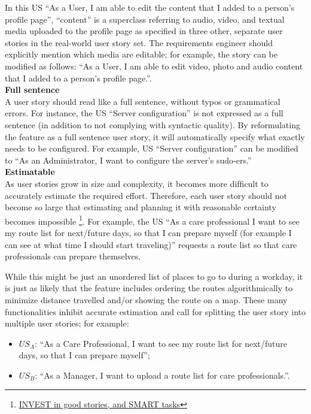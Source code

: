 In this US \enquote{As a User, I am able to edit the content that I added to a person's profile page}, \enquote{content} is a superclass referring to audio, video, and textual media uploaded to the proﬁle page as speciﬁed in three other, separate user stories in the real-world user story set. The requirements engineer should explicitly mention which media are editable; for example, the story can be modiﬁed as follows: \enquote{As a User, I am able to edit video, photo and audio content that I added to a person’s proﬁle page.}. \\ 
\textbf{Full sentence}\\ 
A user story should read like a full sentence, without typos or grammatical errors. For instance, the US \enquote{Server conﬁguration} is not expressed as a full sentence (in addition to not complying with syntactic quality). By reformulating the feature as a full sentence user story, it will automatically specify what exactly needs to be conﬁgured. For example, US \enquote{Server conﬁguration} can be modiﬁed to \enquote{As an Administrator, I want to conﬁgure the server’s sudo-ers.} \\ 
\textbf{Estimatable}\\ 
As user stories grow in size and complexity, it becomes more difﬁcult to accurately estimate the required effort. Therefore, each user story should not become so large that estimating and planning it with reasonable certainty becomes impossible \footnote{\href{http://xp123.com/articles/invest-in-good-stories-and-smart-tasks/.Accessed 2015-02-18}{INVEST in good stories, and SMART tasks}}. For example, the US \enquote{As a care professional I want to see my route list for next/future days, so that I can prepare myself (for example I can see at what time I should start traveling)} requests a route list so that care professionals can prepare themselves. 

While this might be just an unordered list of places to go to during a workday, it is just as likely that the feature includes ordering the routes algorithmically to minimize distance travelled and/or showing the route on a map. These many functionalities inhibit accurate estimation and call for splitting the user story into multiple user stories; for example:
\begin{itemize}
\item $US_A$: \enquote{As a Care Professional, I want to see my route list for next/future days, so that I can prepare myself};
\item $US_B$: \enquote{As a Manager, I want to upload a route list for care professionals.}.
\end{itemize}

